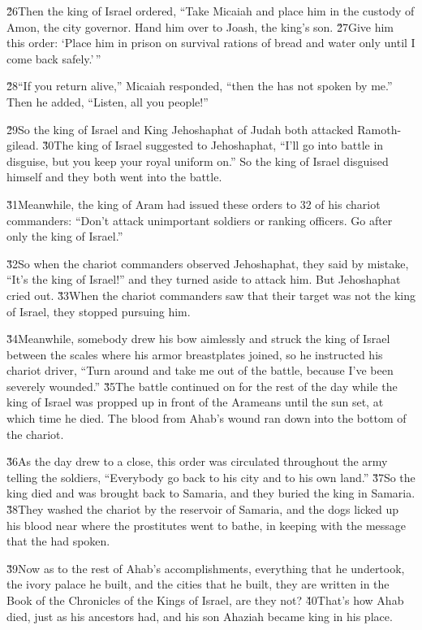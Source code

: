 \v{26}Then the king of Israel ordered, ``Take Micaiah and place him in the custody of Amon, the city governor. Hand him over to Joash, the king's son. \v{27}Give him this order: `Place him in prison on survival rations of bread and water only until I come back safely.'\,''

\v{28}``If you return alive,'' Micaiah responded, ``then the  has not spoken by me.'' Then he added, ``Listen, all you people!''

\v{29}So the king of Israel and King Jehoshaphat of Judah both attacked Ramoth-gilead. \v{30}The king of Israel suggested to Jehoshaphat, ``I'll go into battle in disguise, but you keep your royal uniform on.'' So the king of Israel disguised himself and they both went into the battle.

\v{31}Meanwhile, the king of Aram had issued these orders to 32 of his chariot commanders: ``Don't attack unimportant soldiers or ranking officers. Go after only the king of Israel.''

\v{32}So when the chariot commanders observed Jehoshaphat, they said by mistake, ``It's the king of Israel!'' and they turned aside to attack him. But Jehoshaphat cried out. \v{33}When the chariot commanders saw that their target was not the king of Israel, they stopped pursuing him.

\v{34}Meanwhile, somebody drew his bow aimlessly and struck the king of Israel between the scales where his armor breastplates joined, so he instructed his chariot driver, ``Turn around and take me out of the battle, because I've been severely wounded.'' \v{35}The battle continued on for the rest of the day while the king of Israel was propped up in front of the Arameans until the sun set, at which time he died. The blood from Ahab's wound ran down into the bottom of the chariot.

\v{36}As the day drew to a close, this order was circulated throughout the army telling the soldiers, ``Everybody go back to his city and to his own land.'' \v{37}So the king died and was brought back to Samaria, and they buried the king in Samaria. \v{38}They washed the chariot by the reservoir of Samaria, and the dogs licked up his blood near where the prostitutes went to bathe, in keeping with the message that the  had spoken.

\v{39}Now as to the rest of Ahab's accomplishments, everything that he undertook, the ivory palace he built, and the cities that he built, they are written in the Book of the Chronicles of the Kings of Israel, are they not? \v{40}That's how Ahab died, just as his ancestors had, and his son Ahaziah became king in his place.

